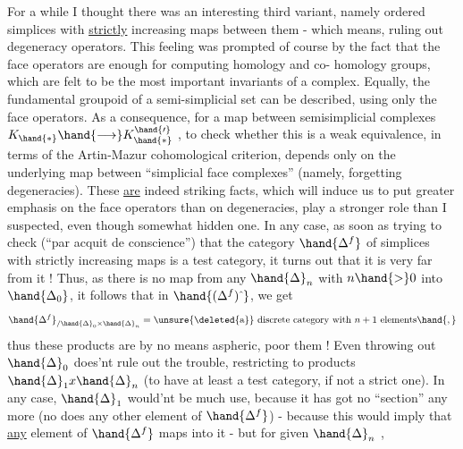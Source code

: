 For a while I thought there was an interesting third variant, namely
ordered simplices with \uline{strictly} increasing maps between them - which means,
ruling out degeneracy operators. This feeling was prompted of course by 
the fact that the face operators  are enough for computing homology and co-%
homology groups, which are felt to be  the most important invariants of a
complex. Equally, the fundamental groupoid of a semi-simplicial set can
be described, using only the face operators. As a consequence, for a
map between semisimplicial complexes $K_{\hand{*}}\hand{\longrightarrow}K^{\hand{\prime}}_{\hand{*}}$ , to check whether this is
a weak equivalence, in terms of the Artin-Mazur cohomological criterion,
depends only on the underlying map between ``simplicial face complexes''
(namely, forgetting degeneracies). These \uline{are} indeed striking facts,
which will induce us to put greater emphasis on the face operators than on
degeneracies,   play a stronger role
than I suspected, even though  somewhat hidden one. In any case, as soon
as trying to check (``par acquit de conscience'') that the category $\hand{\Delta^f}$
of simplices with strictly increasing maps is a  test category, it turns
out that it is very far from it ! Thus, as there is no map from any
$\hand{\Delta}_n$ with $n \hand{>} 0$ into $\hand{\Delta_0}$, it follows that in $\hand{(\Delta^f)\hat{\ }}$, we get
\[ \hand{\Delta^f}_{/\hand{\Delta}_0 \times \hand{\Delta}_n} = \text{\unsure{\deleted{a}} discrete category with $n+1$ elements}\hand{,} \]
thus these products are by no means aspheric,  poor them ! Even
throwing out $\hand{\Delta}_0$  does'nt rule out the trouble,  restricting  to products
$\hand{\Delta}_1 x \hand{\Delta}_n$ (to have at least a test category, if not a strict one). In any
case, $\hand{\Delta}_1$ would'nt be  much use,  because it has got no
``section'' any more (no does any other element of $\hand{\Delta^f}$) - because this
would imply that \uline{any} element of $\hand{\Delta^f}$ maps into it - but for given $\hand{\Delta}_n$ ,
